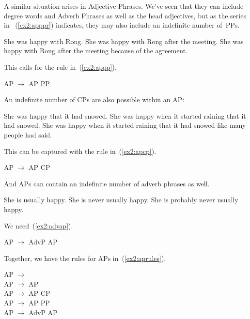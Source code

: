 A similar situation arises in Adjective Phrases. We've seen that they can include degree words and Adverb Phrases as well as the head adjectives, but as the series in ~(\ref{ex2:apppr}) indicates, they may also include an indefinite number of~PPs.
\begin{exe}
	\raggedright
	\ex \label{ex2:apppr} 
	\begin{xlist}
		\ex She was happy with Rong.
		\ex She was happy with Rong after the meeting.
		\ex She was happy with Rong after the meeting because of the agreement.
	\end{xlist}
\end{exe}
This calls for the rule in~(\ref{ex2:appp}).
\begin{exe}
	\raggedright
	\ex \label{ex2:appp} 
	AP $\rightarrow$ AP PP
\end{exe}
An indefinite number of CPs are also possible within an AP:
\begin{exe}
	\raggedright
	\ex \label{ex2:apcpr} 
	\begin{xlist}
		\ex She was happy that it had snowed.
		\ex She was happy when it started raining that it had snowed.
		\ex She was happy when it started raining that it had snowed like many people had said.
	\end{xlist}
\end{exe}
This can be captured with the rule in~(\ref{ex2:apcp}).
\begin{exe}
	\raggedright
	\ex \label{ex2:apcp} 
	AP $\rightarrow$ AP CP
\end{exe}
And APs can contain an indefinite number of adverb phrases as well.
\pagebreak
\begin{exe}
	\raggedright
	\ex \label{ex2:advr} 
	\begin{xlist}
		\ex She is usually happy.
		\ex She is never usually happy.
		\ex She is probably never usually happy.
	\end{xlist}
\end{exe}
We need~(\ref{ex2:advap}).
\begin{exe}
	\raggedright
	\ex \label{ex2:advap} 
	AP $\rightarrow$ AdvP AP
\end{exe}
Together, we have the rules for APs in~(\ref{ex2:aprules}).
\begin{exe}
	\raggedright
	\ex \label{ex2:aprules} 
	AP $\rightarrow$ \\
	AP $\rightarrow$  AP\\
	AP $\rightarrow$ AP CP\\
	AP $\rightarrow$ AP PP\\
	AP $\rightarrow$ AdvP AP
\end{exe}

